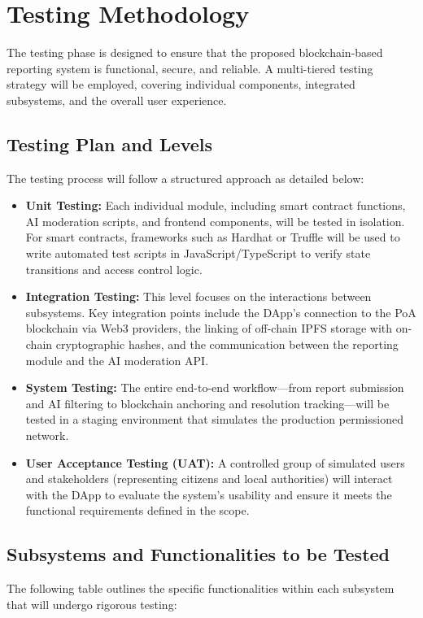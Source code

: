 \section{Testing Methodology}
\label{sec:testing_methodology}

The testing phase is designed to ensure that the proposed blockchain-based reporting system is functional, secure, and reliable. A multi-tiered testing strategy will be employed, covering individual components, integrated subsystems, and the overall user experience.

\subsection{Testing Plan and Levels}
The testing process will follow a structured approach as detailed below:

\begin{itemize}
    \item \textbf{Unit Testing:} Each individual module, including smart contract functions, AI moderation scripts, and frontend components, will be tested in isolation. For smart contracts, frameworks such as Hardhat or Truffle will be used to write automated test scripts in JavaScript/TypeScript to verify state transitions and access control logic.
    \item \textbf{Integration Testing:} This level focuses on the interactions between subsystems. Key integration points include the DApp's connection to the PoA blockchain via Web3 providers, the linking of off-chain IPFS storage with on-chain cryptographic hashes, and the communication between the reporting module and the AI moderation API.
    \item \textbf{System Testing:} The entire end-to-end workflow—from report submission and AI filtering to blockchain anchoring and resolution tracking—will be tested in a staging environment that simulates the production permissioned network.
    \item \textbf{User Acceptance Testing (UAT):} A controlled group of simulated users and stakeholders (representing citizens and local authorities) will interact with the DApp to evaluate the system's usability and ensure it meets the functional requirements defined in the scope.
\end{itemize}

\subsection{Subsystems and Functionalities to be Tested}
The following table outlines the specific functionalities within each subsystem that will undergo rigorous testing:

